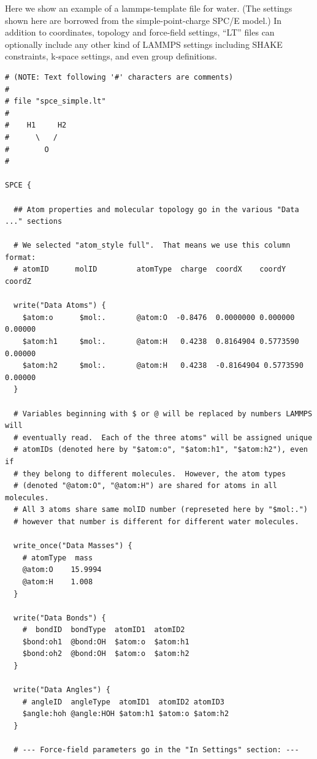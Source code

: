 \documentclass[11pt]{article}
\begin{document}
  Here we show an example of a lammps-template file for water.
(The settings shown here are borrowed from the simple-point-charge 
 \cite{Berendsen++StraatsmaJPhysChem1987} SPC/E model.) 
In addition to coordinates, topology and force-field settings, 
``LT'' files can optionally include any other kind of LAMMPS settings
including SHAKE constraints, k-space settings, and even group definitions.
\begin{verbatim}
# (NOTE: Text following '#' characters are comments)
#
# file "spce_simple.lt" 
#
#    H1     H2
#      \   /
#        O
#

SPCE {

  ## Atom properties and molecular topology go in the various "Data ..." sections

  # We selected "atom_style full".  That means we use this column format:
  # atomID      molID         atomType  charge  coordX    coordY    coordZ

  write("Data Atoms") {
    $atom:o      $mol:.       @atom:O  -0.8476  0.0000000 0.000000  0.00000
    $atom:h1     $mol:.       @atom:H   0.4238  0.8164904 0.5773590 0.00000
    $atom:h2     $mol:.       @atom:H   0.4238  -0.8164904 0.5773590 0.00000
  }

  # Variables beginning with $ or @ will be replaced by numbers LAMMPS will
  # eventually read.  Each of the three atoms" will be assigned unique
  # atomIDs (denoted here by "$atom:o", "$atom:h1", "$atom:h2"), even if
  # they belong to different molecules.  However, the atom types
  # (denoted "@atom:O", "@atom:H") are shared for atoms in all molecules.
  # All 3 atoms share same molID number (represeted here by "$mol:.")
  # however that number is different for different water molecules.

  write_once("Data Masses") {
    # atomType  mass
    @atom:O    15.9994
    @atom:H    1.008
  }

  write("Data Bonds") {
    #  bondID  bondType  atomID1  atomID2
    $bond:oh1  @bond:OH  $atom:o  $atom:h1
    $bond:oh2  @bond:OH  $atom:o  $atom:h2
  }

  write("Data Angles") {
    # angleID  angleType  atomID1  atomID2 atomID3
    $angle:hoh @angle:HOH $atom:h1 $atom:o $atom:h2
  }

  # --- Force-field parameters go in the "In Settings" section: ---


\end{verbatim}
\end{document}
